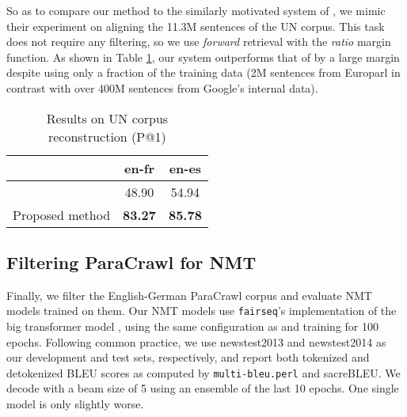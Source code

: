 \documentclass[11pt,a4paper]{article}
\begin{document}
So as to compare our method to the similarly motivated system of \citet{guo:2018:wmt_effective}, we mimic their experiment on aligning the 11.3M sentences of the UN corpus. This task does not require any filtering, so we use \textit{forward} retrieval with the \textit{ratio} margin function. As shown in Table \ref{tab:results_un}, our system outperforms that of \citet{guo:2018:wmt_effective} by a large margin despite using only a fraction of the training data (2M sentences from Europarl in contrast with over 400M sentences from Google's internal data).


\begin{table}[t]
\begin{small}
\begin{center}
  \begin{tabular}{lcc}
    \toprule
    & \bf en-fr & \bf en-es \\
    \midrule
    \citet{guo:2018:wmt_effective} & 48.90 & 54.94 \\
    \midrule
    Proposed method & \bf 83.27 & \bf 85.78 \\
    \bottomrule
  \end{tabular}
\end{center}
\end{small}
\caption{Results on UN corpus reconstruction (P@1)}
\label{tab:results_un}
\end{table}


\subsection{Filtering ParaCrawl for NMT} \label{subsec:paracrawl}

Finally, we filter the English-German ParaCrawl corpus and evaluate NMT models trained on them. Our NMT models use \texttt{fairseq}'s implementation of the big transformer model \citep{vaswani2017attention}, using the same configuration as \citet{Ott:2018:wmt_scale_nmt} and training for 100 epochs. Following common practice, we use newstest2013 and newstest2014 as our development and test sets, respectively, and report both tokenized and detokenized BLEU scores as computed by \texttt{multi-bleu.perl} and sacreBLEU. We decode with a beam size of 5 using an ensemble of the last 10 epochs. One single model is only slightly worse.
\end{document}

